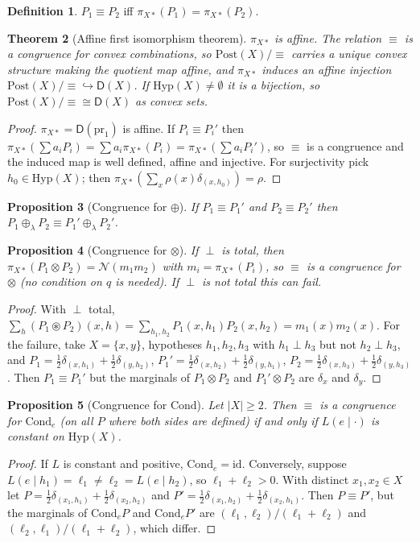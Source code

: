 \documentclass[11pt]{article}
\newtheorem{theorem}{Theorem}[section]
\newtheorem{proposition}[theorem]{Proposition}
\theoremstyle{definition}
\newtheorem{definition}[theorem]{Definition}
\theoremstyle{remark}
\newcommand{\D}{\mathsf{D}}
\newcommand{\Hyp}{\mathrm{Hyp}}
\newcommand{\Post}{\mathrm{Post}}
\newcommand{\Cond}{\mathrm{Cond}}
\newcommand{\id}{\mathrm{id}}
\newcommand{\N}{\mathcal{N}}
\newcommand{\cp}{\circledast}
\begin{document}
\begin{definition}
$P_1\equiv P_2$ iff $\pi_{X*}(P_1)=\pi_{X*}(P_2)$.
\end{definition}

\begin{theorem}[Affine first isomorphism theorem]\label{thm:firstiso}
$\pi_{X*}$ is affine. The relation $\equiv$ is a congruence for convex combinations, so
$\Post(X)/{\equiv}$ carries a unique convex structure making the quotient map affine, and
$\pi_{X*}$ induces an affine injection $\Post(X)/{\equiv}\hookrightarrow\D(X)$. If
$\Hyp(X)\neq\emptyset$ it is a bijection, so $\Post(X)/{\equiv}\cong\D(X)$ as convex sets.
\end{theorem}
\begin{proof}
$\pi_{X*}=\D(\mathrm{pr}_1)$ is affine. If $P_i\equiv P_i'$ then
$\pi_{X*}(\sum a_iP_i)=\sum a_i\pi_{X*}(P_i)=\pi_{X*}(\sum a_iP_i')$, so $\equiv$ is a congruence and
the induced map is well defined, affine and injective. For surjectivity pick $h_0\in\Hyp(X)$; then
$\pi_{X*}(\sum_x\rho(x)\delta_{(x,h_0)})=\rho$.
\end{proof}

\begin{proposition}[Congruence for $\oplus$]
If $P_1\equiv P_1'$ and $P_2\equiv P_2'$ then $P_1\oplus_\lambda P_2\equiv P_1'\oplus_\lambda P_2'$.
\end{proposition}

\begin{proposition}[Congruence for $\otimes$]\label{prop:cong-tensor}
If $\perp$ is total, then $\pi_{X*}(P_1\otimes P_2)=\N(m_1m_2)$ with $m_i=\pi_{X*}(P_i)$, so $\equiv$
is a congruence for $\otimes$ (no condition on $q$ is needed). If $\perp$ is not total this can fail.
\end{proposition}
\begin{proof}
With $\perp$ total, $\sum_h(P_1\cp P_2)(x,h)=\sum_{h_1,h_2}P_1(x,h_1)P_2(x,h_2)=m_1(x)m_2(x)$.
For the failure, take $X=\{x,y\}$, hypotheses $h_1,h_2,h_3$ with $h_1\perp h_3$ but not
$h_2\perp h_3$, and
$P_1=\tfrac12\delta_{(x,h_1)}+\tfrac12\delta_{(y,h_2)}$,
$P_1'=\tfrac12\delta_{(x,h_2)}+\tfrac12\delta_{(y,h_1)}$,
$P_2=\tfrac12\delta_{(x,h_3)}+\tfrac12\delta_{(y,h_3)}$. Then $P_1\equiv P_1'$ but the marginals of
$P_1\otimes P_2$ and $P_1'\otimes P_2$ are $\delta_x$ and $\delta_y$.
\end{proof}

\begin{proposition}[Congruence for $\Cond$]\label{prop:cong-cond}
Let $|X|\ge2$. Then $\equiv$ is a congruence for $\Cond_e$ (on all $P$ where both sides are defined)
if and only if $L(e\mid\cdot)$ is constant on $\Hyp(X)$.
\end{proposition}
\begin{proof}
If $L$ is constant and positive, $\Cond_e=\id$. Conversely, suppose $L(e\mid h_1)=\ell_1\ne
\ell_2=L(e\mid h_2)$, so $\ell_1+\ell_2>0$. With distinct $x_1,x_2\in X$ let
$P=\tfrac12\delta_{(x_1,h_1)}+\tfrac12\delta_{(x_2,h_2)}$ and
$P'=\tfrac12\delta_{(x_1,h_2)}+\tfrac12\delta_{(x_2,h_1)}$. Then $P\equiv P'$, but the marginals of
$\Cond_eP$ and $\Cond_eP'$ are $(\ell_1,\ell_2)/(\ell_1+\ell_2)$ and $(\ell_2,\ell_1)/(\ell_1+\ell_2)$,
which differ.
\end{proof}
\end{document}
